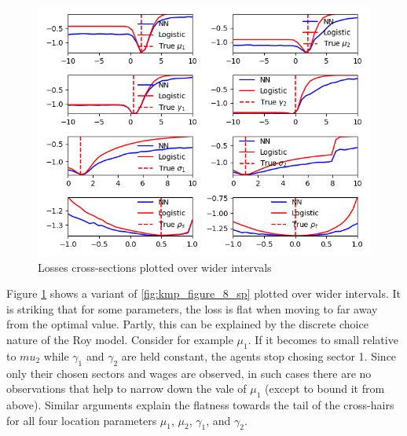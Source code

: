 \begin{figure}
    \includegraphics[width=\textwidth]{./Images/wide_loss_plots.png} %
    \caption{Losses cross-sections plotted over wider intervals}
    \label{fig:wide_loss_plots}
\end{figure}

Figure \ref{fig:wide_loss_plots} shows a variant of \ref{fig:kmp_figure_8_sp} plotted over wider intervals.
It is striking that for some parameters, the loss is flat when moving to far away from the optimal value.
Partly, this can be explained by the discrete choice nature of the Roy model.
Consider for example $\mu_1$.
If it becomes to small relative to $mu_2$ while $\gamma_1$ and $\gamma_2$ are held constant, the agents stop chosing sector 1.
Since only their chosen sectors and wages are observed, in such cases there are no observations that help to narrow down the vale of $\mu_1$ (except to bound it from above).
Similar arguments explain the flatness towards the tail of the cross-hairs for all four location parameters $\mu_1$, $\mu_2$, $\gamma_1$, and $\gamma_2$. %

